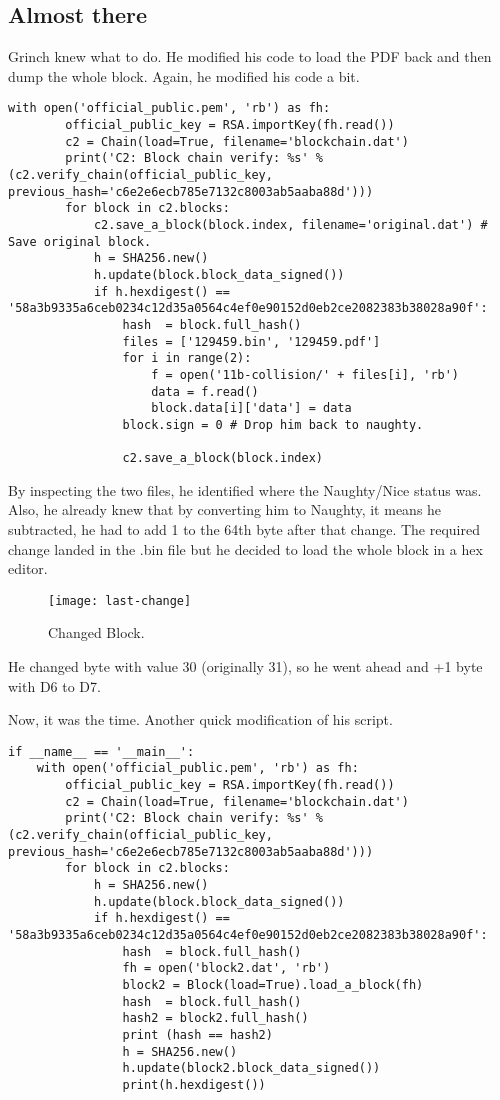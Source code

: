 \subsection{Almost there}

Grinch knew what to do. He modified his code to load the PDF back and then dump the whole block.
Again, he modified his code a bit.
\begin{verbatim}
with open('official_public.pem', 'rb') as fh:
        official_public_key = RSA.importKey(fh.read())
        c2 = Chain(load=True, filename='blockchain.dat')
        print('C2: Block chain verify: %s' % (c2.verify_chain(official_public_key, previous_hash='c6e2e6ecb785e7132c8003ab5aaba88d')))
        for block in c2.blocks:
            c2.save_a_block(block.index, filename='original.dat') # Save original block.
            h = SHA256.new()
            h.update(block.block_data_signed())
            if h.hexdigest() == '58a3b9335a6ceb0234c12d35a0564c4ef0e90152d0eb2ce2082383b38028a90f':
                hash  = block.full_hash()
                files = ['129459.bin', '129459.pdf']
                for i in range(2):
                    f = open('11b-collision/' + files[i], 'rb')
                    data = f.read()
                    block.data[i]['data'] = data
                block.sign = 0 # Drop him back to naughty.

                c2.save_a_block(block.index)
\end{verbatim}

By inspecting the two files, he identified where the Naughty/Nice status was. Also, he already knew that by converting him to Naughty, it means he subtracted, he had to add 1 to the 64th byte after that change.
The required change landed in the .bin file but he decided to load the whole block in a hex editor.

\begin{figure}[h!]
  \texttt{[image: last-change]}
  \caption{Changed Block.}
\end{figure}

He changed byte with value 30 (originally 31), so he went ahead and +1 byte with D6 to D7.

Now, it was the time. Another quick modification of his script.
\begin{verbatim}
if __name__ == '__main__':
    with open('official_public.pem', 'rb') as fh:
        official_public_key = RSA.importKey(fh.read())
        c2 = Chain(load=True, filename='blockchain.dat')
        print('C2: Block chain verify: %s' % (c2.verify_chain(official_public_key, previous_hash='c6e2e6ecb785e7132c8003ab5aaba88d')))
        for block in c2.blocks:
            h = SHA256.new()
            h.update(block.block_data_signed())
            if h.hexdigest() == '58a3b9335a6ceb0234c12d35a0564c4ef0e90152d0eb2ce2082383b38028a90f':
                hash  = block.full_hash()
                fh = open('block2.dat', 'rb')
                block2 = Block(load=True).load_a_block(fh)
                hash  = block.full_hash()
                hash2 = block2.full_hash()
                print (hash == hash2)
                h = SHA256.new()
                h.update(block2.block_data_signed())
                print(h.hexdigest())
\end{verbatim}


